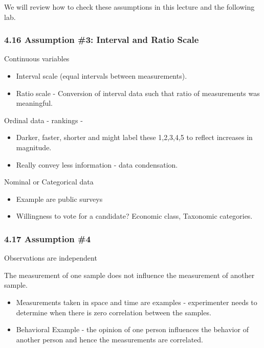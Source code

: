 \documentclass[]{article}
\providecommand{\tightlist}{%
  \setlength{\itemsep}{0pt}\setlength{\parskip}{0pt}}
\begin{document}
We will review how to check these assumptions in this lecture and the
following lab.

\hypertarget{assumption-3-interval-and-ratio-scale}{%
\subsubsection{4.16 Assumption \#3: Interval and Ratio
Scale}\label{assumption-3-interval-and-ratio-scale}}

Continuous variables

\begin{itemize}
\tightlist
\item
  Interval scale (equal intervals between measurements).
\item
  Ratio scale - Conversion of interval data such that ratio of
  measurements was meaningful.
\end{itemize}

Ordinal data - rankings -

\begin{itemize}
\tightlist
\item
  Darker, faster, shorter and might label these 1,2,3,4,5 to reflect
  increases in magnitude.
\item
  Really convey less information - data condensation.
\end{itemize}

Nominal or Categorical data

\begin{itemize}
\tightlist
\item
  Example are public surveys
\item
  Willingness to vote for a candidate? Economic class, Taxonomic
  categories.
\end{itemize}

\hypertarget{assumption-4}{%
\subsubsection{4.17 Assumption \#4}\label{assumption-4}}

Observations are independent

The measurement of one sample does not influence the measurement of
another sample.

\begin{itemize}
\tightlist
\item
  Measurements taken in space and time are examples - experimenter needs
  to determine when there is zero correlation between the samples.
\item
  Behavioral Example - the opinion of one person influences the behavior
  of another person and hence the measurements are correlated.
\end{itemize}
\end{document}
